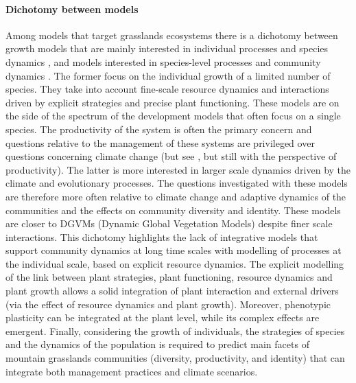 \paragraph{Dichotomy between models}
Among models that target grasslands ecosystems  there is a dichotomy between growth models that are mainly interested in individual processes and species dynamics \cite{soussana_gemini:_2012, taubert_modelling_2014, lohier_analyse_2016}, and models interested in species-level processes and community dynamics \parencite{boulangeat_fate-dh_2014, cotto_dynamic_2017}. The former focus on the individual growth of a limited number of species. They take into account fine-scale resource dynamics and interactions driven by explicit strategies and precise plant functioning. These models are on the side of the spectrum of the development models that often focus on a single species. The productivity of the system is often the primary concern and questions relative to the management of these systems are privileged over questions concerning climate change (but see \cite{rodriguez_lingra-cc:_1999}, but still with the perspective of productivity). The latter is more interested in larger scale dynamics driven by the climate and evolutionary processes. The questions investigated with these models are therefore more often relative to climate change and adaptive dynamics of the communities and the effects on community diversity and identity. These models are closer to DGVMs (Dynamic Global Vegetation Models) despite finer scale interactions. This dichotomy highlights the lack of integrative models that support community dynamics at long time scales with modelling of processes at the individual scale, based on explicit resource dynamics. The explicit modelling of the link between plant strategies, plant functioning, resource dynamics and plant growth allows a solid integration of plant interaction and external drivers (via the effect of resource dynamics and plant growth). Moreover, phenotypic plasticity can be integrated at the plant level, while its complex effects are emergent. Finally, considering the growth of individuals, the strategies of species and the dynamics of the population is required to predict main facets of mountain grasslands communities (diversity, productivity, and identity) that can integrate both management practices and climate scenarios.

